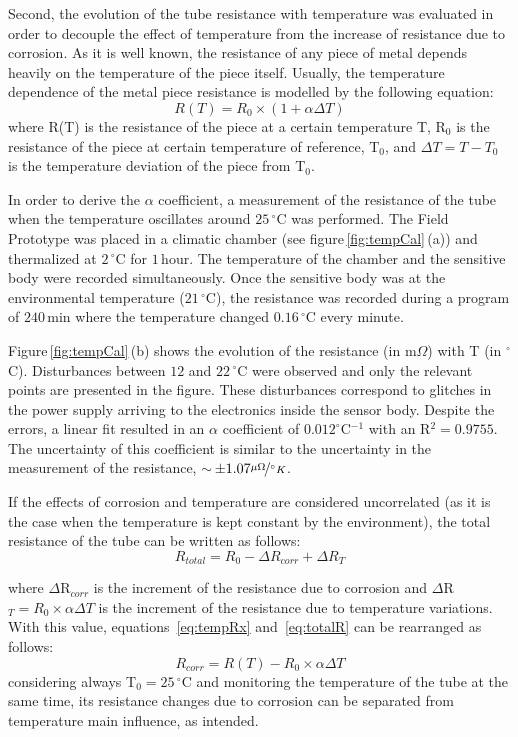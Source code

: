 \documentclass[journal,twoside,web]{ieeecolor}
\begin{document}
Second, the evolution of the tube resistance with temperature was evaluated in order to decouple the effect of temperature from the increase of resistance due to corrosion. As it is well known, the resistance of any piece of metal depends heavily on the temperature of the piece itself. Usually, the temperature dependence of the metal piece resistance is modelled by the following equation:
\begin{equation}
\label{eq:tempRx}
R(T) = R_{0}\times\left(1+\alpha \Delta T\right)
\end{equation}
where R(T) is the resistance of the piece at a certain temperature T, R$_{0}$ is the resistance of the piece at certain temperature of reference, T$_{0}$, and $\Delta T=T-T_{0}$ is the temperature deviation of the piece from T$_{0}$.

In order to derive the $\alpha$ coefficient, a measurement of the resistance of the tube when the temperature oscillates around $25$\,$^{\circ}$C was performed. The Field Prototype was placed in a climatic chamber (see figure\,\ref{fig:tempCal}\,(a)) and thermalized at $2$\,$^{\circ}$C for $1$\,hour. The temperature of the chamber and the sensitive body were recorded simultaneously. Once the sensitive body was at the environmental temperature ($21$\,$^{\circ}$C), the resistance was recorded during a program of $240$\,min where the temperature changed $0.16$\,$^{\circ}$C every minute.

Figure\,\ref{fig:tempCal}\,(b) shows the evolution of the resistance (in m$\Omega$) with T (in $^{\circ}$C). Disturbances between $12$ and $22$\,$^{\circ}$C were observed and only the relevant points are presented in the figure. These disturbances correspond to glitches in the power supply arriving to the electronics inside the sensor body. Despite the errors, a linear fit resulted in an $\alpha$ coefficient of $0.012 ^{\circ}$C$^{-1}$ with an R$^{2}=0.9755$. The uncertainty of this coefficient is similar to the uncertainty in the measurement of the resistance, $\sim$\,$\pm1.07\nicefrac{\mu\Omega}{^{\circ}K}$.

If the effects of corrosion and temperature are considered uncorrelated (as it is the case when the temperature is kept constant by the environment), the total resistance of the tube can be written as follows:
\begin{equation}
\label{eq:totalR}
R_{total} = R_{0}-\Delta R_{corr}+\Delta R_{T}
\end{equation}

where $\Delta$R$_{corr}$ is the increment of the resistance due to corrosion and $\Delta$R$_{T}=R_{0}\times\alpha\Delta T$ is the increment of the resistance due to temperature variations.
With this value, equations~\ref{eq:tempRx} and~\ref{eq:totalR}  can be rearranged as follows:
\begin{equation}
\label{eq:realRx}
R_{corr} = R(T)-R_{0}\times\alpha \Delta T
\end{equation}
considering always T$_{0}=25$\,$^{\circ}$C and monitoring the temperature of the tube at the same time, its resistance changes due to corrosion can be separated from temperature main influence, as intended.
\end{document}
